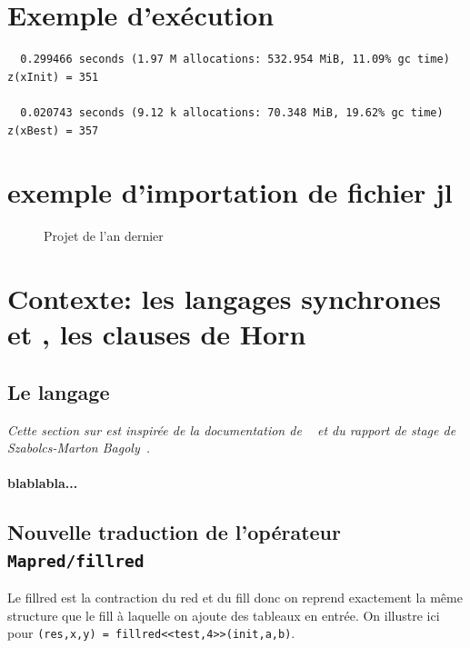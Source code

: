 \section{Exemple d'exécution}

\begin{verbatim}
  0.299466 seconds (1.97 M allocations: 532.954 MiB, 11.09% gc time)
z(xInit) = 351 

  0.020743 seconds (9.12 k allocations: 70.348 MiB, 19.62% gc time)
z(xBest) = 357 
\end{verbatim}

\section{exemple d'importation de fichier jl}

\lstset{language=julia}

\begin{figure}
  \centering
  
  \caption{Projet de l'an dernier}
  \label{fig:ro-l3}
\end{figure}


\section{Contexte: les langages synchrones et \lustre, les clauses de Horn}
\label{section:background}

\subsection{Le langage \lustre}


\emph{Cette section sur \lustre est inspirée de la documentation de
  \lustre~\cite{LustreRefMan,TutorialLustre} et du rapport
  de stage de Szabolcs-Marton Bagoly~\cite{rapportstagesobi}. }

\paragraph{blablabla...}
\medskip

\subsection{Nouvelle traduction de l'opérateur \texttt{Mapred/fillred}}

Le fillred est la contraction du red et du fill donc on reprend exactement la même
structure que le fill à laquelle on ajoute des tableaux en entrée. On
illustre ici pour \texttt{(res,x,y) = fillred<<test,4>>(init,a,b)}.

